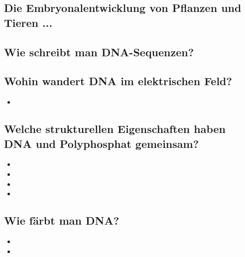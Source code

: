 \documentclass{article}
\begin{document}
\subsection*{Die Embryonalentwicklung von Pflanzen und Tieren ...}
\bigskip\bigskip

\subsection*{Wie schreibt man DNA-Sequenzen?}
\bigskip\bigskip

\subsection*{Wohin wandert DNA im elektrischen Feld?}
\begin{itemize}     \item  \end{itemize}
\bigskip\bigskip

\subsection*{Welche strukturellen Eigenschaften haben DNA und Polyphosphat gemeinsam? }
\begin{itemize}
    \item 
    \item 
    \item 
    \item 
\end{itemize}

\subsection*{Wie färbt man DNA?}
\begin{itemize}
    \item 
    \item 
\end{itemize}
\end{document}
